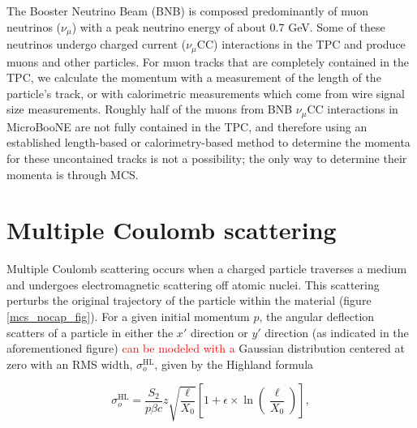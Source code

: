 \documentclass[a4paper,11pt]{article}
\begin{document}
The Booster Neutrino Beam (BNB) is composed predominantly of muon neutrinos ($\nu_\mu$) with a peak neutrino energy of about 0.7 GeV. Some of these neutrinos undergo charged current ($\nu_\mu$CC) interactions in the TPC and produce muons and other particles. For muon tracks that are completely contained in the TPC, we calculate the momentum with a measurement of the length of the particle's track, or with calorimetric measurements which come from wire signal size measurements. Roughly half of the muons from BNB $\nu_\mu$CC interactions in MicroBooNE are not fully contained in the TPC, and therefore using an established length-based or calorimetry-based method to determine the momenta for these uncontained tracks is not a possibility; the only way to determine their momenta is through MCS. \\

\section{Multiple Coulomb scattering}

Multiple Coulomb scattering occurs when a charged particle traverses a medium and undergoes electromagnetic scattering off atomic nuclei. This scattering perturbs the original trajectory of the particle within the material (figure \ref{mcs_nocap_fig}). For a given initial momentum $p$, the angular deflection scatters of a particle in either the $x'$ direction or $y'$ direction (as indicated in the aforementioned figure) \textcolor{red}{can be modeled with a} Gaussian distribution centered at zero with an RMS width, $\sigma_o^{\text{HL}}$, given by the Highland formula \cite{highland,highland-lynch-dahl} 

\begin{equation}\label{highland_eqtn}
	\sigma_o^{\text{HL}}=\frac{S_2}{p\beta c}z\sqrt{\frac{\ell}{X_0}}\left[1+\epsilon\times\ln\left(\frac{\ell}{X_0}\right)\right],
\end{equation}
\end{document}
